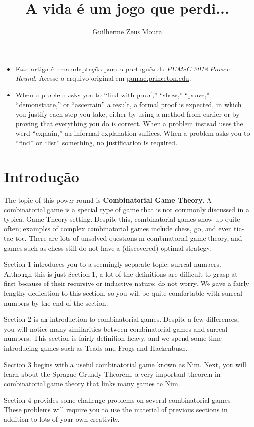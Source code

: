 \documentclass[10pt, a4paper]{article}
\title{A vida é um jogo que perdi...}
\author{Guilherme Zeus Moura}
\begin{document}
	
	\zeustitle

	\begin{itemize}
		\item Esse artigo é uma adaptação para o português da \emph{PUMaC 2018 Power Round}. Acesse o arquivo original em \url{pumac.princeton.edu}.
		\item When a problem asks you to “find with proof,” “show,” “prove,” “demonstrate,” or “ascertain” a result, a formal proof is expected, in which you justify each step you take, either by using a method from earlier or by proving that everything you do is correct. When a problem instead uses the word “explain,” an informal explanation suffices. When a problem asks you to “find” or “list” something, no justification is required.
	\end{itemize}

	\newpage
	\section*{Introdução}

	The topic of this power round is \textbf{Combinatorial Game Theory}. A combinatorial game is a special type of game that is not commonly discussed in a typical Game Theory setting. Despite this, combinatorial games show up quite often; examples of complex combinatorial games include chess, go, and even tic-tac-toe. There are lots of unsolved questions in combinatorial game theory, and games such as chess still do not have a (discovered) optimal strategy.
	
	Section 1 introduces you to a seemingly separate topic: surreal numbers. Although this is just Section 1, a lot of the definitions are difficult to grasp at first because of their recursive or inductive nature; do not worry. We gave a fairly lengthy dedication to this section, so you will be quite comfortable with surreal numbers by the end of the section.

	Section 2 is an introduction to combinatorial games. Despite a few differences, you will notice many similarities between combinatorial games and surreal numbers. This section is fairly definition heavy, and we spend some time introducing games such as Toads and Frogs and Hackenbush.
	
	Section 3 begins with a useful combinatorial game known as Nim. Next, you will learn about the Sprague-Grundy Theorem, a very important theorem in combinatorial game theory that links many games to Nim.

	Section 4 provides some challenge problems on several combinatorial games. These problems will require you to use the material of previous sections in addition to lots of your own creativity.
\end{document}
